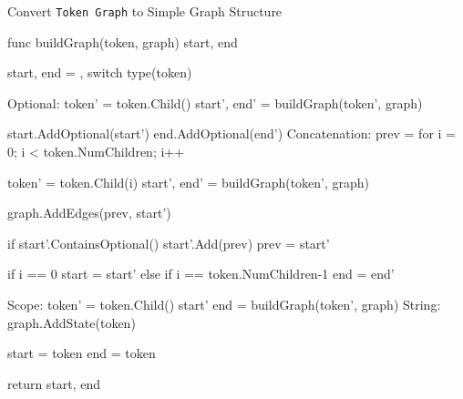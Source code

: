 \begin{listing}[H]
\caption{Convert \texttt{Token Graph} to Simple Graph Structure}
\label{lst:tavor-cli-convert-token-graph}
\begin{gocode}
func buildGraph(token, graph) start, end {
  start, end = {}, {}
  switch type(token) {
    Optional:
      token' = token.Child()
      start', end' = buildGraph(token', graph)

      start.AddOptional(start')
      end.AddOptional(end')
    Concatenation:
      prev = {}
      for i = 0; i < token.NumChildren; i++ {
        token' = token.Child(i)
        start', end' = buildGraph(token', graph)

        graph.AddEdges(prev, start')

        if start'.ContainsOptional() {
          start'.Add(prev)
        }
        prev = start'

        if i == 0 {
          start = start'
        } else if i == token.NumChildren-1 {
          end = end'
        }
      }
    Scope:
      token' = token.Child()
      start' end = buildGraph(token', graph)
    String:
      graph.AddState(token)

      start = {token}
      end = {token}
  }
  return start, end
}
\end{gocode}
\end{listing}

